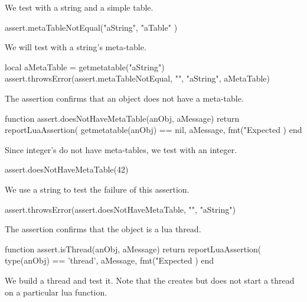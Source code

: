
We test with a string and a simple table.

\startLuaTest
  assert.metaTableNotEqual("aString", { "aTable" })
\stopLuaTest
\stopTestCase


We will test with a string's meta-table.

\startLuaTest
  local aMetaTable = getmetatable("aString")
  assert.throwsError(assert.metaTableNotEqual, "",
    "aString", aMetaTable)
\stopLuaTest
\stopTestCase

\stopTestSuite


The  assertion confirms that an object 
does not have a meta-table. 

\startLuaCode
function assert.doesNotHaveMetaTable(anObj, aMessage)
  return reportLuaAssertion(
    getmetatable(anObj) == nil,
    aMessage,
    fmt("Expected %
  )
end
\stopLuaCode


Since integer's do not have meta-tables, we test with an integer.

\startLuaTest
  assert.doesNotHaveMetaTable(42)
\stopLuaTest
\stopTestCase


We use a string to test the failure of this assertion. 

\startLuaTest
  assert.throwsError(assert.doesNotHaveMetaTable, "", "aString")
\stopLuaTest
\stopTestCase

\stopTestSuite


The  assertion confirms that the object is a lua 
thread. 

\startLuaCode
function assert.isThread(anObj, aMessage)
  return reportLuaAssertion(
    type(anObj) == 'thread',
    aMessage,
    fmt("Expected %
  )
end
\stopLuaCode


We build a thread and test it. Note that the  
creates but does not start a thread on a particular lua function. 

